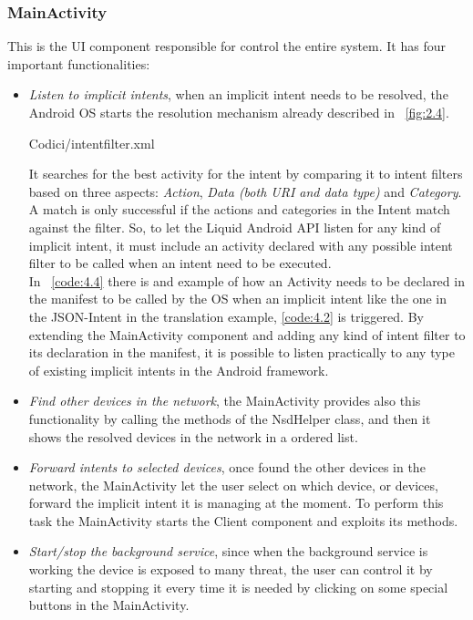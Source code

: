 \subsubsection{MainActivity}
This is the UI component responsible for control the entire system. It has four important functionalities:
\begin{itemize}
	\item \textit{Listen to implicit intents}, when an implicit intent needs to be resolved, the Android OS starts the resolution mechanism already described in \figurename~\ref{fig:2.4}.
		\begin{lstinputlisting}[
		morekeywords={action, itype, category, categories, extras, type, data, key,intent,filter,activity},
		caption={Intent filter example},
		label=code:4.4]
		{Codici/intentfilter.xml}
	\end{lstinputlisting}
	It searches for the best activity for the intent by comparing it to intent filters based on three aspects: \textit{Action}, \textit{Data (both URI and data type)} and \textit{Category}. A match is only successful if the actions and categories in the Intent match against the filter. So, to let the Liquid Android API listen for any kind of implicit intent, it must include an activity declared with any possible intent filter to be called when an intent need to be executed.\\
	In \lstlistingname~\ref{code:4.4} there is and example of how an Activity needs to be declared in the manifest to be called by the OS when an implicit intent like the one in the JSON-Intent in the translation example, \ref{code:4.2} is triggered.
	By extending the MainActivity component and adding any kind of intent filter to its declaration in the manifest, it is possible to listen practically to any type of existing implicit intents in the Android framework.
	\item \textit{Find other devices in the network}, the MainActivity provides also this functionality by calling the methods of the NsdHelper class, and then it shows the resolved devices in the network in a ordered list.
	\item \textit{Forward intents to selected devices}, once found the other devices in the network, the MainActivity let the user select on which device, or devices, forward the implicit intent it is managing at the moment. To perform this task the MainActivity starts the Client component and exploits its methods.
	\item \textit{Start/stop the background service}, since when the background service is working the device is exposed to many threat, the user can control it by starting and stopping it every time it is needed by clicking on some special buttons in the MainActivity. 
	
\end{itemize}

